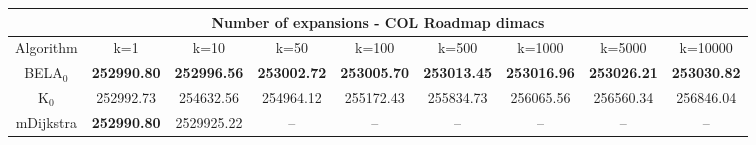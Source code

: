 \begin{tabular}{c|cccccccc}\toprule
\multicolumn{9}{c}{Number of expansions - COL Roadmap dimacs}\\ \midrule
Algorithm & k=1 & k=10 & k=50 & k=100 & k=500 & k=1000 & k=5000 & k=10000 \\ \midrule
BELA$_0$ & \textbf{252990.80} & \textbf{252996.56} & \textbf{253002.72} & \textbf{253005.70} & \textbf{253013.45} & \textbf{253016.96} & \textbf{253026.21} & \textbf{253030.82} \\
K$_0$ & 252992.73 & 254632.56 & 254964.12 & 255172.43 & 255834.73 & 256065.56 & 256560.34 & 256846.04 \\
mDijkstra & \textbf{252990.80} & 2529925.22 & -- & -- & -- & -- & -- & -- \\ \bottomrule 
\end{tabular}
